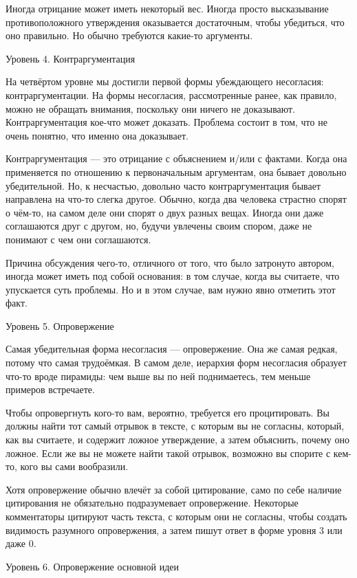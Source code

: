 \documentclass[ebook,12pt,oneside,openany]{memoir}
\begin{document}
Иногда отрицание может иметь некоторый вес. Иногда просто высказывание
противоположного утверждения оказывается достаточным, чтобы убедиться,
что оно правильно. Но обычно требуются какие-то аргументы.

Уровень 4. Контраргументация

На четвёртом уровне мы достигли первой формы убеждающего несогласия:
контраргументации. На формы несогласия, рассмотренные ранее, как
правило, можно не обращать внимания, поскольку они ничего не
доказывают. Контраргументация кое-что может доказать. Проблема состоит
в том, что не очень понятно, что именно она доказывает.

Контраргументация — это отрицание с объяснением и/или с фактами. Когда
она применяется по отношению к первоначальным аргументам, она бывает
довольно убедительной. Но, к несчастью, довольно часто
контраргументация бывает направлена на что-то слегка другое. Обычно,
когда два человека страстно спорят о чём-то, на самом деле они спорят
о двух разных вещах. Иногда они даже соглашаются друг с другом, но,
будучи увлечены своим спором, даже не понимают с чем они соглашаются.

Причина обсуждения чего-то, отличного от того, что было затронуто
автором, иногда может иметь под собой основания: в том случае, когда
вы считаете, что упускается суть проблемы. Но и в этом случае, вам
нужно явно отметить этот факт.

Уровень 5. Опровержение

Самая убедительная форма несогласия — опровержение. Она же самая
редкая, потому что самая трудоёмкая. В самом деле, иерархия форм
несогласия образует что-то вроде пирамиды: чем выше вы по ней
поднимаетесь, тем меньше примеров встречаете.

Чтобы опровергнуть кого-то вам, вероятно, требуется его процитировать.
Вы должны найти тот самый отрывок в тексте, с которым вы не согласны,
который, как вы считаете, и содержит ложное утверждение, а затем
объяснить, почему оно ложное. Если же вы не можете найти такой
отрывок, возможно вы спорите с кем-то, кого вы сами вообразили.

Хотя опровержение обычно влечёт за собой цитирование, само по себе
наличие цитирования не обязательно подразумевает опровержение.
Некоторые комментаторы цитируют часть текста, с которым они не
согласны, чтобы создать видимость разумного опровержения, а затем
пишут ответ в форме уровня 3 или даже 0.

Уровень 6. Опровержение основной идеи
\end{document}
